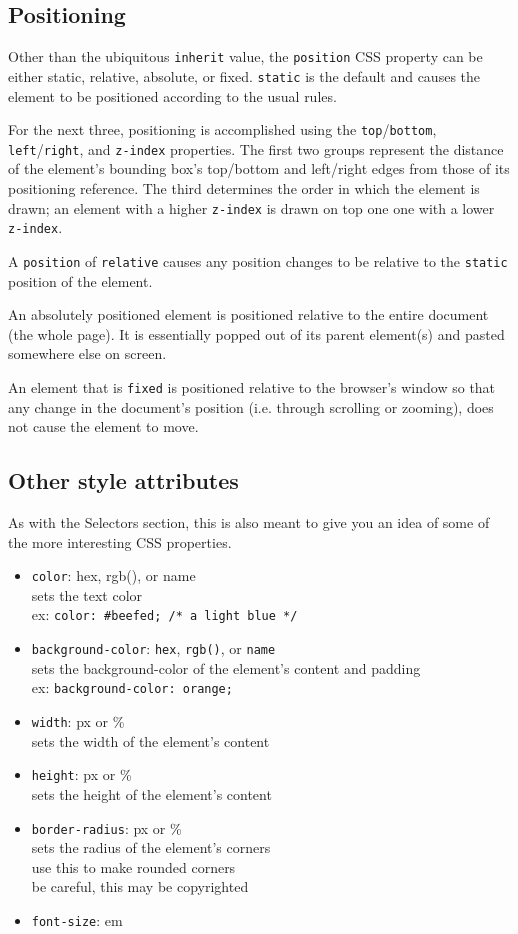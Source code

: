 \documentclass[12pt]{article}
\begin{document}
\subsection{Positioning}

Other than the ubiquitous \texttt{inherit} value, the \texttt{position} CSS property can be either static, relative, absolute, or fixed. \texttt{static} is the default and causes the element to be positioned according to the usual rules. 
\par
For the next three, positioning is accomplished using the \texttt{top}/\texttt{bottom}, \texttt{left}/\texttt{right}, and \texttt{z-index} properties. The first two groups represent the distance of the element's bounding box's top/bottom and left/right edges from those of its positioning reference. The third determines the order in which the element is drawn; an element with a higher \texttt{z-index} is drawn on top one one with a lower \texttt{z-index}.
\par
A \texttt{position} of \texttt{relative} causes any position changes to be relative to the \texttt{static} position of the element.
\par
An absolutely positioned element is positioned relative to the entire document (the whole page). It is essentially popped out of its parent element(s) and pasted somewhere else on screen.
\par
An element that is \texttt{fixed} is positioned relative to the browser's window so that any change in the document's position (i.e. through scrolling or zooming), does not cause the element to move.
\subsection{Other style attributes}
As with the Selectors section, this is also meant to give you an idea of some of the more interesting CSS properties.
\begin{itemize}
\item \texttt{color}: hex, rgb(), or name
  \\ sets the text color
  \\ ex: \texttt{color: \#beefed; /* a light blue */}
\item \texttt{background-color}: \texttt{hex}, \texttt{rgb()}, or \texttt{name}
  \\ sets the background-color of the element's content and padding
  \\ ex: \texttt{background-color: orange;}
\item \texttt{width}: px or \%
  \\ sets the width of the element's content
\item \texttt{height}: px or \%
  \\ sets the height of the element's content
\item \texttt{border-radius}: px or \%
  \\ sets the radius of the element's corners
  \\ use this to make rounded corners
  \\ be careful, this may be copyrighted
\item \texttt{font-size}: em
\end{itemize}
\end{document}
